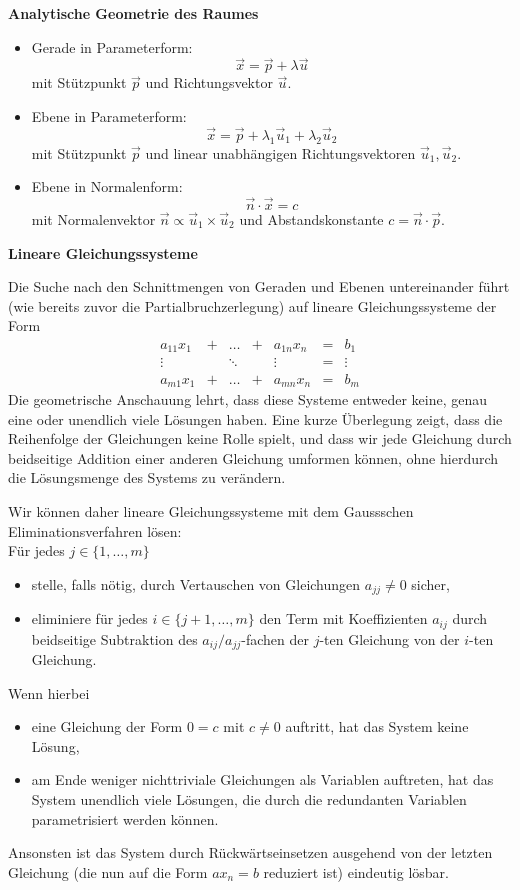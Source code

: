 \documentclass[a4paper,10pt]{article}
\begin{document}
\pagebreak

{\bf Analytische Geometrie des Raumes}

\begin{itemize}
\item Gerade in Parameterform:
\[
\vec{x}=\vec{p}+\lambda\vec{u}
\]
mit Stützpunkt $\vec{p}$ und Richtungsvektor $\vec{u}$.

\item Ebene in Parameterform:
\[
\vec{x}=\vec{p}+\lambda_1\vec{u}_1+\lambda_2\vec{u}_2
\]
mit Stützpunkt $\vec{p}$ und linear unabhängigen Richtungsvektoren
$\vec{u}_1,\vec{u}_2$.

\item Ebene in Normalenform:
\[
\vec{n}\cdot\vec{x}=c
\]
mit Normalenvektor $\vec{n}\propto \vec{u}_1\times\vec{u}_2$ und
Abstandskonstante $c=\vec{n}\cdot\vec{p}$.
\end{itemize}

{\bf Lineare Gleichungssysteme}

Die Suche nach den Schnittmengen von Geraden und Ebenen untereinander
führt (wie bereits zuvor die Partialbruchzerlegung) auf lineare
Gleichungssysteme der Form
\[
\begin{array}{ccccccc}
a_{11}x_1&+&\ldots&+&a_{1n}x_n &=& b_1\\
\vdots &&\ddots&&\vdots &=&\vdots \\
a_{m1}x_1&+&\ldots&+&a_{mn}x_n&=&b_m
\end{array}
\]
Die geometrische Anschauung lehrt, dass diese Systeme entweder keine,
genau eine oder unendlich viele Lösungen haben.
Eine kurze Überlegung zeigt, dass die Reihenfolge der
Gleichungen keine
Rolle spielt, und dass wir jede Gleichung durch beidseitige Addition
einer anderen Gleichung umformen können, ohne hierdurch die Lösungsmenge
des Systems zu verändern.

Wir können daher lineare Gleichungssysteme mit dem Gaussschen
Eliminationsverfahren lösen:\\
Für jedes $j\in\{1,\ldots,m\}$
\begin{itemize}
\item stelle, falls nötig, durch Vertauschen von Gleichungen
$a_{jj}\not=0$ sicher,
\item eliminiere für jedes $i\in\{j+1,\ldots,m\}$ den Term mit
Koeffizienten $a_{ij}$ durch beidseitige Subtraktion des
$a_{ij}/a_{jj}$-fachen der $j$-ten Gleichung von der $i$-ten Gleichung.
\end{itemize}
Wenn hierbei
\begin{itemize}
\item eine Gleichung der Form $0=c$ mit $c\not=0$ auftritt,
hat das System keine Lösung,
\item am Ende weniger nichttriviale Gleichungen als Variablen
auftreten, hat das System unendlich viele Lösungen, die durch die
redundanten Variablen parametrisiert werden können.
\end{itemize}
Ansonsten ist das System durch Rückwärtseinsetzen ausgehend von der
letzten Gleichung (die nun auf die Form $ax_n=b$ reduziert ist)
eindeutig lösbar.\\
\end{document}
